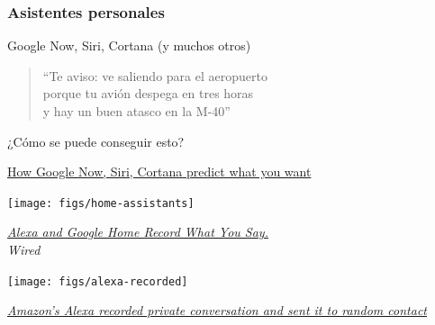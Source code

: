 \documentclass[17pt,aspectratio=169]{beamer}
\begin{document}

\begin{frame}
\frametitle{Asistentes personales}

\begin{flushright}
  Google Now, Siri, Cortana (y muchos otros)
\end{flushright}

\begin{quote}
  ``Te aviso:
  ve saliendo para el aeropuerto \\
  porque tu avión despega en tres horas \\
  y hay un buen atasco en la M-40'' \\
\end{quote}

¿Cómo se puede conseguir esto?

\begin{flushright}
  {\tiny \href{http://searchengineland.com/how-google-now-siri-cortana-predict-what-you-want-229799}{How Google Now, Siri, Cortana predict what you want}}
\end{flushright}
\end{frame}

\begin{frame}[fragile]

  \begin{center}
  \texttt{[image: figs/home-assistants]}
  \end{center}

  \begin{flushright}
    {\em
      \href{https://www.wired.com/2016/12/alexa-and-google-record-your-voice/}{Alexa and Google Home Record What You Say.} \\
      Wired \\
      }
  \end{flushright}
  
\end{frame}

\begin{frame}[fragile]

  \begin{center}
  \texttt{[image: figs/alexa-recorded]}
  \end{center}

  \begin{flushright}
    {\em \tiny
      \href{https://www.theguardian.com/technology/2018/may/24/amazon-alexa-recorded-conversation}{Amazon's Alexa recorded private conversation and sent it to random contact}}
  \end{flushright}
  
\end{frame}
\end{document}
